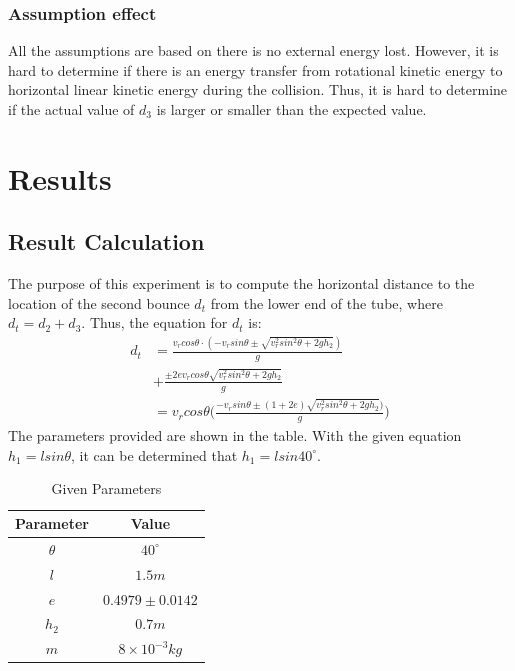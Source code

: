 \documentclass[conference]{IEEEtran}
\begin{document}
        \subsubsection{Assumption effect}
            All the assumptions are based on there is no external energy lost. However, it is hard to determine if there is an energy transfer from rotational kinetic energy to horizontal linear kinetic energy during the collision. Thus, it is hard to determine if the actual value of $d_3$ is larger or smaller than the expected value.
    \section{Results}
        \subsection{Result Calculation}
            The purpose of this experiment is to compute the horizontal distance to the location of the second bounce $d_t$ from the lower end of the tube, where $d_t = d_2 + d_3$. Thus, the equation for $d_t$ is:
            \begin{equation}\label{d_t}
                \begin{aligned}
                    d_t &= \frac{v_rcos\theta \cdot (-v_{r}sin\theta\pm\sqrt{{v^2_{r}sin^2\theta}+2gh_2})}{g}\\&+\frac{\pm2ev_rcos\theta\sqrt{{v^2_{r}sin^2\theta}+2gh_2}}{g} \\
                    &= v_rcos\theta \Big(\frac{-v_rsin\theta\pm(1+2e)\sqrt{{v^2_{r}sin^2\theta}+2gh_2})}{g}\Big)
                \end{aligned}
            \end{equation}
            The parameters provided are shown in the table. With the given equation $h_1 = lsin\theta$, it can be determined that $h_1 = lsin40^\circ$.
            \begin{table}[H]
                \caption {Given Parameters} \label{parameters} 
                \begin{center}
                    \begin{tabular}{cc}
                        \hline
                        Parameter & Value \\
                        \hline
                        $\theta$     & $40^\circ$     \\
                        $l$         & $1.5m$     \\
                        $e$         & $0.4979 \pm 0.0142$     \\
                        $h_2$        & $0.7m$     \\
                        $m$         & $8\times10^{-3}kg$     \\
                        \hline
                    \end{tabular}
                \end{center}
            \end{table}
\end{document}
